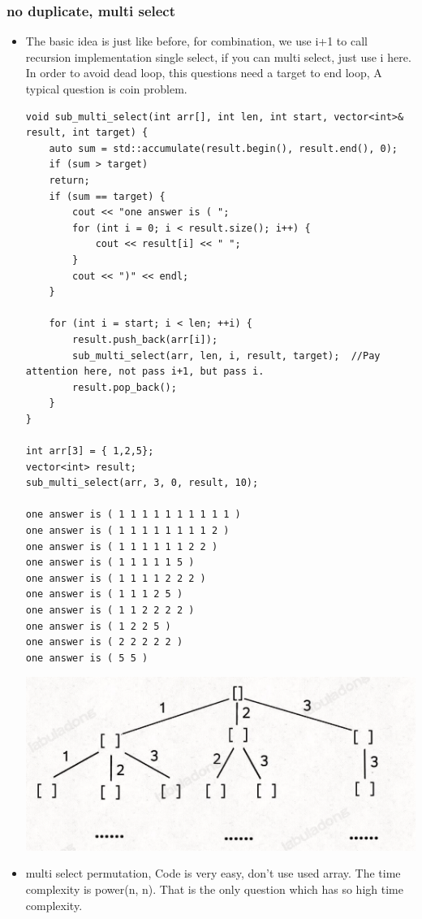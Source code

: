\documentclass[a4paper,11pt,twoside]{book}
\begin{document}
\subsubsection{no duplicate, multi select}
\begin{itemize}
	\item The basic idea is just like before, for combination, we use i+1 to call recursion implementation single select, if you can multi select, just use i here. In order to avoid dead loop, this questions need a target to end loop, A typical question is coin problem.
\begin{lstlisting}
void sub_multi_select(int arr[], int len, int start, vector<int>& result, int target) {
	auto sum = std::accumulate(result.begin(), result.end(), 0);
	if (sum > target)
	return;
	if (sum == target) {
		cout << "one answer is ( ";
		for (int i = 0; i < result.size(); i++) {
			cout << result[i] << " ";
		}
		cout << ")" << endl;
	}
	
	for (int i = start; i < len; ++i) {
		result.push_back(arr[i]);
		sub_multi_select(arr, len, i, result, target);  //Pay attention here, not pass i+1, but pass i. 
		result.pop_back();
	}
}

int arr[3] = { 1,2,5};
vector<int> result;
sub_multi_select(arr, 3, 0, result, 10);

one answer is ( 1 1 1 1 1 1 1 1 1 1 )
one answer is ( 1 1 1 1 1 1 1 1 2 )
one answer is ( 1 1 1 1 1 1 2 2 )
one answer is ( 1 1 1 1 1 5 )
one answer is ( 1 1 1 1 2 2 2 )
one answer is ( 1 1 1 2 5 )
one answer is ( 1 1 2 2 2 2 )
one answer is ( 1 2 2 5 )
one answer is ( 2 2 2 2 2 )
one answer is ( 5 5 )

\end{lstlisting}

\begin{center}
	\includegraphics[width=0.7\linewidth]{pics/sub_multi}
\end{center}

	\item multi select permutation, Code is very easy, don't use used array. The time complexity is power(n, n). That is the only question which has so high time complexity. 
	

\end{itemize}
\end{document}
